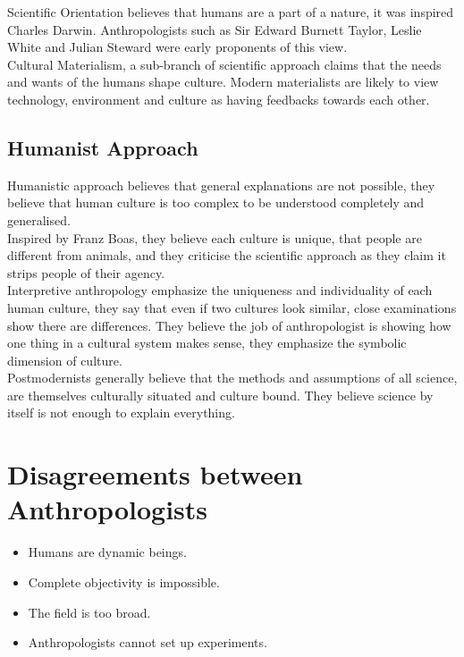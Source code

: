 \documentclass[11pt,a4paper]{book}
\begin{document}
Scientific Orientation believes that humans are a part of a nature, it was inspired Charles Darwin. Anthropologists such as Sir Edward Burnett Taylor, Leslie White and Julian Steward were early proponents of this view.\\
 
Cultural Materialism, a sub-branch of scientific approach claims that the needs and wants of the humans shape culture. Modern materialists are likely to view technology, environment and culture as having feedbacks towards each other.

\subsection{Humanist Approach}

Humanistic approach believes that general explanations are not possible, they believe that human culture is too complex to be understood completely and generalised.\\

Inspired by Franz Boas, they believe each culture is unique, that people are different from animals, and they criticise the scientific approach as they claim it strips people of their agency.\\

Interpretive anthropology emphasize the uniqueness and individuality of each human culture, they say that even if two cultures look similar, close examinations show there are differences. They believe the job of anthropologist is showing how one thing in a cultural system makes sense, they emphasize the symbolic dimension of culture.\\

Postmodernists generally believe that the methods and assumptions of all science, are themselves culturally situated and culture bound. They believe science by itself is not enough to explain everything.

\section{Disagreements between Anthropologists}

\begin{itemize}
\item Humans are dynamic beings.
\item Complete objectivity is impossible.
\item The field is too broad.
\item Anthropologists cannot set up experiments.
\end{itemize}
\end{document}
